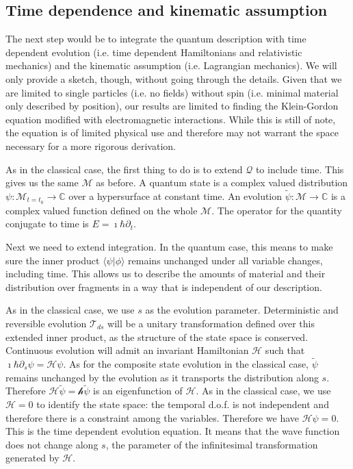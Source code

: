 \documentclass[smallextended]{svjour3}
\numberwithin{equation}{section}
\theoremstyle{definition}
\begin{document}
\subsection{Time dependence and kinematic assumption}

The next step would be to integrate the quantum description with time dependent evolution (i.e. time dependent Hamiltonians and relativistic mechanics) and the kinematic assumption (i.e. Lagrangian mechanics). We will only provide a sketch, though, without going through the details. Given that we are limited to single particles (i.e. no fields) without spin (i.e. minimal material only described by position), our results are limited to finding the Klein-Gordon equation modified with electromagnetic interactions. While this is still of note, the equation is of limited physical use and therefore may not warrant the space necessary for a more rigorous derivation.

As in the classical case, the first thing to do is to extend $\mathcal{Q}$ to include time. This gives us the same $\mathcal{M}$ as before. A quantum state is a complex valued distribution $\psi : \mathcal{M}_{t=t_0} \rightarrow \mathbb{C}$ over a hypersurface at constant time. An evolution $\widetilde{\psi} : \mathcal{M} \rightarrow \mathbb{C}$ is a complex valued function defined on the whole $\mathcal{M}$. The operator for the quantity conjugate to time is $E=\imath\hbar\partial_t$.

Next we need to extend integration. In the quantum case, this means to make sure the inner product $\langle \psi | \phi \rangle$ remains unchanged under all variable changes, including time. This allows us to describe the amounts of material and their distribution over fragments in a way that is independent of our description.

As in the classical case, we use $s$ as the evolution parameter. Deterministic and reversible evolution $\mathcal{T}_{ds}$ will be a unitary transformation defined over this extended inner product, as the structure of the state space is conserved. Continuous evolution will admit an invariant Hamiltonian $\mathcal{H}$ such that $\imath \hbar \partial_s \psi = \mathcal{H} \psi$. As for the composite state evolution in the classical case, $\widetilde{\psi}$ remains unchanged by the evolution as it transports the distribution along $s$. Therefore $\mathcal{H} \widetilde{\psi} = \mathcal{h} \widetilde{\psi}$ is an eigenfunction of $\mathcal{H}$. As in the classical case, we use $\mathcal{H}=0$ to identify the state space: the temporal d.o.f. is not independent and therefore there is a constraint among the variables. Therefore we have $\mathcal{H} \psi = 0$. This is the time dependent evolution equation. It means that the wave function does not change along $s$, the parameter of the infinitesimal transformation generated by $\mathcal{H}$.
\end{document}
